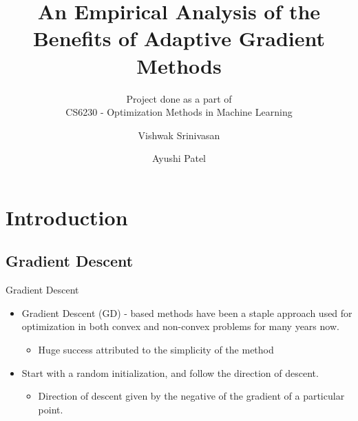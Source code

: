 \documentclass[10pt]{beamer}
\title[Analysis of AG Methods]{An Empirical Analysis of the Benefits of Adaptive Gradient Methods}
\subtitle{Project done as a part of \\
CS6230 - Optimization Methods in Machine Learning}
\author{Vishwak Srinivasan \and Ayushi Patel}
\newcommand{\g}{\nabla}
\newcommand{\xbold}{\mathbf{x}}
\begin{document}
\begin{frame}
\titlepage
\end{frame}

\section{Introduction}
\subsection{Gradient Descent}
\begin{frame}{Gradient Descent}
\begin{itemize}
\item<1->{Gradient Descent (GD) - based methods have been a staple approach used for optimization
          in both convex and non-convex problems for many years now.
          \begin{itemize}
          \item<2->{Huge success attributed to the simplicity of the method}
          \end{itemize}
         }
\item<3->{Start with a random initialization, and follow the direction of descent.
          \begin{itemize}
          \item<4->{Direction of descent given by the negative of the gradient of a particular point.}
          \end{itemize}
         }
\uncover<5->{\[\xbold := \xbold - \eta \g f(\xbold)\]}
\end{itemize}
\end{frame}
\end{document}
